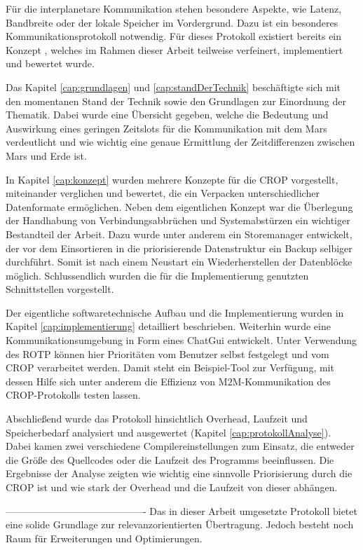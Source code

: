 
Für die interplanetare Kommunikation stehen besondere Aspekte, wie Latenz,
Bandbreite oder der lokale Speicher im Vordergrund. Dazu ist ein besonderes
Kommunikationsprotokoll notwendig. Für dieses Protokoll existiert
bereits ein Konzept \cite{Daher}, welches im Rahmen dieser Arbeit
teilweise verfeinert, implementiert und bewertet wurde.

Das Kapitel \ref{cap:grundlagen} und \ref{cap:standDerTechnik} beschäftigte sich
mit den momentanen Stand der Technik sowie den Grundlagen zur Einordnung der
Thematik. Dabei wurde eine Übersicht gegeben, welche die Bedeutung und
Auswirkung eines geringen Zeitslots für die Kommunikation mit dem Mars
verdeutlicht und wie wichtig eine genaue Ermittlung der Zeitdifferenzen zwischen
Mars und Erde ist.

In Kapitel \ref{cap:konzept} wurden mehrere Konzepte für die CROP vorgestellt,
miteinander verglichen und bewertet, die ein Verpacken unterschiedlicher
Datenformate ermöglichen. Neben dem eigentlichen Konzept war die Überlegung der
Handhabung von Verbindungsabbrüchen und Systemabstürzen ein wichtiger
Bestandteil der Arbeit. Dazu wurde unter anderem ein Storemanager entwickelt,
der vor dem Einsortieren in die priorisierende Datenstruktur ein Backup selbiger
durchführt. Somit ist nach einem Neustart ein Wiederherstellen der Datenblöcke
möglich. Schlussendlich wurden die für die Implementierung genutzten
Schnittstellen vorgestellt.

Der eigentliche softwaretechnische Aufbau und die Implementierung wurden in
Kapitel \ref{cap:implementierung} detailliert beschrieben. Weiterhin wurde eine
Kommunikationsumgebung in Form eines ChatGui entwickelt. Unter Verwendung des ROTP
können hier Prioritäten vom Benutzer selbst festgelegt und vom CROP verarbeitet
werden. Damit steht ein Beispiel-Tool zur Verfügung, mit dessen Hilfe sich
unter anderem die Effizienz von M$2$M-Kommunikation des CROP-Protokolls testen
lassen.

Abschließend wurde das Protokoll hinsichtlich Overhead, Laufzeit und
Speicherbedarf analysiert und ausgewertet (Kapitel \ref{cap:protokollAnalyse}).
Dabei kamen zwei verschiedene Compilereinstellungen zum Einsatz, die entweder
die Größe des Quellcodes oder die Laufzeit des Programms beeinflussen. Die
Ergebnisse der Analyse zeigten wie wichtig eine sinnvolle Priorisierung durch
die CROP ist und wie stark der Overhead und die Laufzeit von dieser abhängen.

------------------------------------------- \newline
Das in dieser Arbeit umgesetzte Protokoll bietet eine solide
Grundlage zur relevanzorientierten Übertragung. Jedoch besteht noch Raum
für Erweiterungen und Optimierungen.

